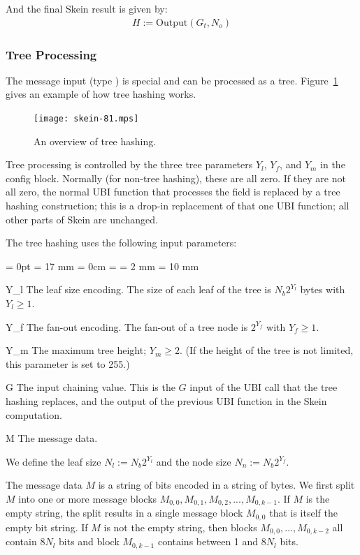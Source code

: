 \documentclass[11pt,twoside]{article}
\def\symdef#1{\label{symdef:#1}}
\newcommand{\Output}{\text{Output}\xspace}
\newcommand{\TypeSymbol}[1]{\text{$T_\text{#1}$}\xspace}
\newcommand{\TypeMsg}{\TypeSymbol{msg}}
\newcommand{\parameterlabel}[1]{$#1$\hfill}
\newenvironment{parameters}{\begin{list}{?}{%
\parsep = 0pt
\leftmargin = 17 mm
\rightmargin = 0cm
\listparindent = \parindent
\labelsep = 2 mm
\labelwidth = 10 mm
\let\makelabel\parameterlabel
}%
}{\end{list}}
\begin{document}
And the final Skein result is given by:
\begin{align*}
  H := \Output( G_t, N_o )
\end{align*}

\subsubsection{Tree Processing}\label{sec:treehash}

The message input (type \TypeMsg) is special and can be processed as a tree. Figure~\ref{fig:treeHashing} gives an example of how tree hashing works.
%
\begin{figure}[tbhp]
\begin{center}
\texttt{[image: skein-81.mps]}
\end{center}
\caption{An overview of tree hashing.}\label{fig:treeHashing}
\end{figure}
%
Tree processing is controlled by the three tree parameters $Y_l$, $Y_f$, and $Y_m$ in the config block. Normally (for non-tree hashing), these are all zero. If they are not all zero, the normal UBI function that processes the \TypeMsg field is replaced by a tree hashing construction; this is a drop-in replacement of that one UBI function; all other parts of Skein are unchanged.

The tree hashing uses the following input parameters:
\begin{parameters}
  \item[Y_l] The leaf size encoding. The size of each leaf of the tree is $N_b 2^{Y_l}$ bytes with $Y_l \geq 1$.\symdef{Y_l}
  \item[Y_f] The fan-out encoding. The fan-out of a tree node is $2^{Y_f}$ with $Y_f \geq 1$.\symdef{Y_f}
  \item[Y_m] The maximum tree height; $Y_m \geq 2$. (If the height of the tree is not limited, this parameter is set to 255.)\symdef{Y_m}
  \item[G] The input chaining value. This is the $G$ input of the UBI call that the tree hashing replaces, and the output of the previous UBI function in the Skein computation.
  \item[M] The message data.
\end{parameters}
We define the leaf size $N_l := N_b 2^{Y_l}$ and the node size $N_n := N_b 2^{Y_f}$.

The message data $M$ is a string of bits encoded in a string of bytes. We first split $M$ into one or more message blocks $M_{0,0}, M_{0,1}, M_{0,2}, ..., M_{0,k-1}$. If $M$ is the empty string, the split results in a single message block $M_{0,0}$ that is itself the empty bit string. If $M$ is not the empty string, then blocks $M_{0,0}, \ldots, M_{0,k-2}$ all contain $8N_l$ bits and block $M_{0,k-1}$ contains between 1 and $8N_l$ bits.
\end{document}
